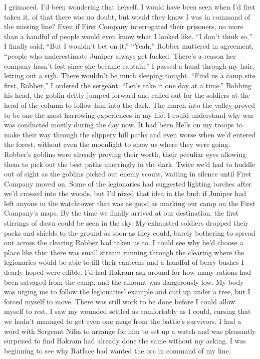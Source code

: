 \documentclass[12pt, openany]{book}
\begin{document}
I grimaced. I’d been wondering that herself. I would have been seen when I’d first taken it, of that there was no doubt, but would they know I was in command of the missing line? Even if First Company interrogated their prisoners, no more than a handful of people would even know what I looked like.
“I don’t think so,” I finally said, “But I wouldn’t bet on it.”
“Yeah,” Robber muttered in agreement, “people who underestimate Juniper always get fucked. There’s a reason her company hasn’t lost since she became captain.”
I passed a hand through my hair, letting out a sigh. There wouldn’t be much sleeping tonight.
“Find us a camp site first, Robber,” I ordered the sergeant. “Let’s take it one day at a time.”
Bobbing his head, the goblin deftly jumped forward and called out for the soldiers at the head of the column to follow him into the dark.
The march into the valley proved to be one the most harrowing experiences in my life. I could understand why war was conducted mostly during the day now. It had been Hells on my troops to make their way through the slippery hill paths and even worse when we’d entered the forest, without even the moonlight to show us where they were going. Robber’s goblins were already proving their worth, their peculiar eyes allowing them to pick out the best paths unerringly in the dark. Twice we’d had to huddle out of sight as the goblins picked out enemy scouts, waiting in silence until First Company moved on. Some of the legionaries had suggested lighting torches after we’d crossed into the woods, but I’d nixed that idea in the bud: if Juniper had left anyone in the watchtower that was as good as marking our camp on the First Company’s maps. By the time we finally arrived at our destination, the first stirrings of dawn could be seen in the sky.
My exhausted soldiers dropped their packs and shields to the ground as soon as they could, barely bothering to spread out across the clearing Robber had taken us to. I could see why he’d choose a place like this: there was small stream running through the clearing where the legionaries would be able to fill their canteens and a handful of berry bushes I dearly hoped were edible. I’d had Hakram ask around for how many rations had been salvaged from the camp, and the amount was dangerously low. My body was urging me to follow the legionaries’ example and curl up under a tree, but I forced myself to move. There was still work to be done before I could allow myself to rest. I saw my wounded settled as comfortably as I could, cursing that we hadn’t managed to get even one mage from the battle’s survivors. I had a word with Sergeant Nilin to arrange for him to set up a watch and was pleasantly surprised to find Hakram had already done the same without my asking. I was beginning to see why Ratface had wanted the orc in command of my line.
\end{document}
